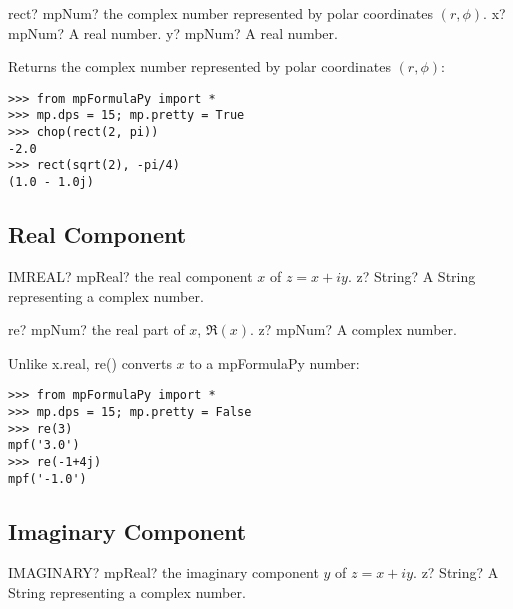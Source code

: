 \begin{mpFunctionsExtract}
	\mpFunctionTwo
	{rect? mpNum? the complex number represented by polar coordinates $(r,\phi)$.}
	{x? mpNum? A real number.}
	{y? mpNum? A real number.}
\end{mpFunctionsExtract}



\vpara
Returns the complex number represented by polar coordinates $(r,\phi)$:

\begin{lstlisting}
>>> from mpFormulaPy import *
>>> mp.dps = 15; mp.pretty = True
>>> chop(rect(2, pi))
-2.0
>>> rect(sqrt(2), -pi/4)
(1.0 - 1.0j)
\end{lstlisting}



\subsection{Real Component}

\begin{mpFunctionsExtract}
	\mpWorksheetFunctionOneNotImplemented
	{IMREAL? mpReal? the real component $x$ of $z=x+iy$.}
	{z? String? A String representing a complex number.}
\end{mpFunctionsExtract}

\vspace{0.6cm}

\begin{mpFunctionsExtract}
	\mpFunctionOne
	{re? mpNum? the real part of $x$, $\Re(x)$.}
	{z? mpNum? A complex number.}
\end{mpFunctionsExtract}


\vpara
Unlike x.real, re() converts $x$ to a mpFormulaPy number:

\begin{lstlisting}
>>> from mpFormulaPy import *
>>> mp.dps = 15; mp.pretty = False
>>> re(3)
mpf('3.0')
>>> re(-1+4j)
mpf('-1.0')
\end{lstlisting}


\subsection{Imaginary Component}

\begin{mpFunctionsExtract}
	\mpWorksheetFunctionOneNotImplemented
	{IMAGINARY? mpReal? the imaginary component $y$ of $z=x+iy$.}
	{z? String? A String representing a complex number.}
\end{mpFunctionsExtract}


